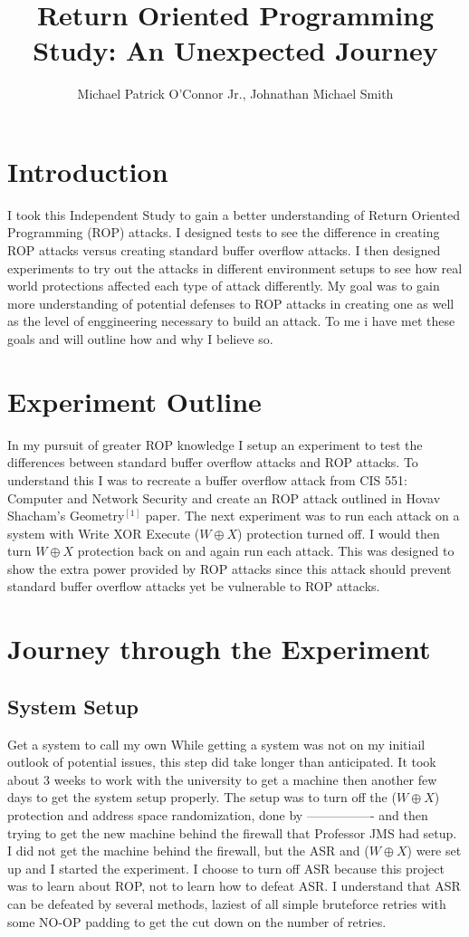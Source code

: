 \documentclass[11pt]{amsart}
\title{Return Oriented Programming Study: \newline An Unexpected Journey}
\author{Michael Patrick O'Connor Jr., Johnathan Michael Smith}
\date{}
\begin{document}
\maketitle

\newpage
\section*{Introduction}
I took this Independent Study to gain a better understanding of Return Oriented Programming (ROP) attacks. I designed tests to see the difference in creating ROP attacks versus creating standard buffer overflow attacks.  I then designed experiments to try out the attacks in different environment setups to see how real world protections affected each type of attack differently.  My goal was to gain more understanding of potential defenses to ROP attacks in creating one as well as the level of enggineering necessary to build an attack.  To me i have met these goals and will outline how and why I believe so.
\section*{Experiment Outline}
In my pursuit of greater ROP knowledge I setup an experiment to test the differences between standard buffer overflow attacks and ROP attacks.  To understand this I was to recreate a buffer overflow attack from CIS 551: Computer and Network Security and create an ROP attack outlined in Hovav Shacham's Geometry$^[1]$ paper.
The next experiment was to run each attack on a system with Write XOR Execute ($W \oplus X$) protection turned off.  I would then turn $W \oplus X$ protection back on and again run each attack.  This was designed to show the extra power provided by ROP attacks since this attack should prevent standard buffer overflow attacks yet be vulnerable to ROP attacks.
\section*{Journey through the Experiment}
\subsection*{System Setup}
Get a system to call my own
While getting a system was not on my initiail outlook of potential issues, this step did take longer than anticipated.  It took about 3 weeks to work with the university to get a machine then another few days to get the system setup properly.  The setup was to turn off the ($W \oplus X$) protection and address space randomization, done by ---------------- and then trying to get the new machine behind the firewall that Professor JMS had setup.  I did not get the machine behind the firewall, but the ASR and ($W \oplus X$) were set up and I started the experiment.
I choose to turn off ASR because this project was to learn about ROP, not to learn how to defeat ASR.  I understand that ASR can be defeated by several methods, laziest of all simple bruteforce retries with some NO-OP padding to get the cut down on the number of retries.
\end{document}
